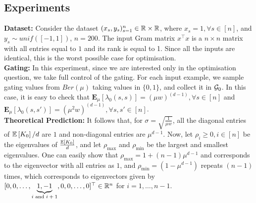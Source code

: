 \subsection{Experiments}
\textbf{Dataset:} Consider the dataset $(x_s,y_s)_{s=1}^n\in \mathbb{R}\times \mathbb{R}$, where $x_s=1,\forall s\in [n]$, and $y_s\sim unif([-1,1])$, $n=200$. The input Gram matrix $x^\top x$ is a $n\times n$ matrix with all entries equal to $1$ and its rank is equal to 1. Since all the inputs are identical, this is the worst possible case for optimisation.\hfill\\
\textbf{Gating:} In this experiment, since we are interested only in the optimisation question, we take full control of the gating. For each input example, we sample gating values from $Ber(\mu)$ taking values in $\{0,1\}$, and collect it in $\mathcal{G}_0$. In this case, it is easy to check that $\mathbf{E}_{\mu}\left[\lambda_0(s,s)\right]=(\mu w)^{(d-1)},\forall s\in[n]$ and $\mathbf{E}_{\mu}\left[\lambda_0(s,s')\right]=(\mu^2 w)^{(d-1)},\forall s,s'\in[n]$.\hfill\\
\textbf{Theoretical Prediction:} It follows that,  for $\sigma=\sqrt{\frac{1}{\mu w}}$, all the diagonal entries of $\mathbb{E}\left[K_0\right]/d$ are $1$ and non-diagonal entries are $\mu^{d-1}$. Now, let $\rho_i\geq 0,i \in [n]$ be the eigenvalues of $\frac{\mathbb{E}\left[K_0\right]}{d}$, and let $\rho_{\max}$ and $\rho_{\min}$ be the largest and smallest eigenvalues.  One can easily show that $\rho_{\max}=1+(n-1)\mu^{d-1}$ and corresponds to the eigenvector with all entries as $1$, and $\rho_{\min}=(1-\mu^{d-1})$ repeats $(n-1)$ times, which corresponds to eigenvectors given by $[0, 0, \ldots, \underbrace{1, -1}_{\text{$i$ and $i+1$}}, 0,0,\ldots, 0]^\top \in \mathbb{R}^n$ for $i=1,\ldots,n-1$.
